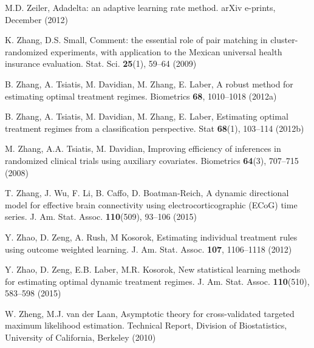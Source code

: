 \begin{list}{}{\setlength{\leftmargin}{2.1em}\setlength{\labelwidth}{0pt}
  \setlength{\labelsep}{0pt}\setlength{\itemindent}{-2.1em}
  \setlength{\parsep}{0pt}\setlength{\itemsep}{2pt}\setlength{\topsep}{0pt}}
\item\label{refentry:REF479}M.D. Zeiler, Adadelta: an adaptive learning rate method. arXiv e-prints, December (2012)\label{refend:REF479}
\item\label{refentry:REF480}K. Zhang, D.S. Small, Comment: the essential role of pair matching in cluster-randomized experiments, with application to the Mexican universal health insurance evaluation. Stat. Sci. \textbf{25}(1), 59--64 (2009)\label{refend:REF480}
\item\label{refentry:REF481}B. Zhang, A. Tsiatis, M. Davidian, M. Zhang, E. Laber, A robust method for estimating optimal treatment regimes. Biometrics \textbf{68}, 1010--1018 (2012a)\label{refend:REF481}
\item\label{refentry:REF482}B. Zhang, A. Tsiatis, M. Davidian, M. Zhang, E. Laber, Estimating optimal treatment regimes from a classification perspective. Stat \textbf{68}(1), 103--114 (2012b)\label{refend:REF482}
\item\label{refentry:REF483}M. Zhang, A.A. Tsiatis, M. Davidian, Improving efficiency of inferences in randomized clinical trials using auxiliary covariates. Biometrics \textbf{64}(3), 707--715 (2008)\label{refend:REF483}
\item\label{refentry:REF484}T. Zhang, J. Wu, F. Li, B. Caffo, D. Boatman-Reich, A dynamic directional model for effective brain connectivity using electrocorticographic (ECoG) time series. J. Am. Stat. Assoc. \textbf{110}(509), 93--106 (2015)\label{refend:REF484}
\item\label{refentry:REF485}Y. Zhao, D. Zeng, A. Rush, M Kosorok, Estimating individual treatment rules using outcome weighted learning. J. Am. Stat. Assoc. \textbf{107}, 1106--1118 (2012)\label{refend:REF485}
\item\label{refentry:REF486}Y. Zhao, D. Zeng, E.B. Laber, M.R. Kosorok, New statistical learning methods for estimating optimal dynamic treatment regimes. J. Am. Stat. Assoc. \textbf{110}(510), 583--598 (2015)\label{refend:REF486}
\item\label{refentry:REF487}W. Zheng, M.J. van der Laan, Asymptotic theory for cross-validated targeted maximum likelihood estimation. Technical Report, Division of Biostatistics, University of California, Berkeley (2010)\label{refend:REF487}

\end{list}
